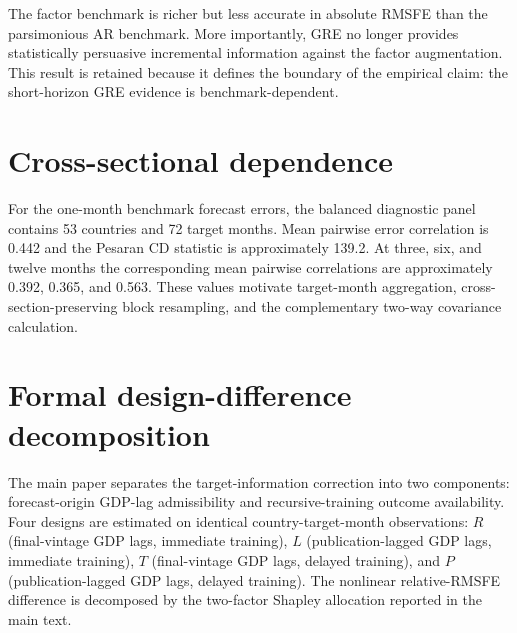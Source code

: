 \documentclass[12pt]{article}
\begin{document}
\begin{table}[htbp]
\centering\scriptsize
\caption{GRE against the wide factor-augmented benchmark at one month}
\end{table}
The factor benchmark is richer but less accurate in absolute RMSFE than the parsimonious AR benchmark. More importantly, GRE no longer provides statistically persuasive incremental information against the factor augmentation. This result is retained because it defines the boundary of the empirical claim: the short-horizon GRE evidence is benchmark-dependent.

\section{Cross-sectional dependence}
For the one-month benchmark forecast errors, the balanced diagnostic panel contains 53 countries and 72 target months. Mean pairwise error correlation is 0.442 and the Pesaran CD statistic is approximately 139.2. At three, six, and twelve months the corresponding mean pairwise correlations are approximately 0.392, 0.365, and 0.563. These values motivate target-month aggregation, cross-section-preserving block resampling, and the complementary two-way covariance calculation.

\section{Formal design-difference decomposition}
The main paper separates the target-information correction into two components: forecast-origin GDP-lag admissibility and recursive-training outcome availability. Four designs are estimated on identical country-target-month observations: $R$ (final-vintage GDP lags, immediate training), $L$ (publication-lagged GDP lags, immediate training), $T$ (final-vintage GDP lags, delayed training), and $P$ (publication-lagged GDP lags, delayed training). The nonlinear relative-RMSFE difference is decomposed by the two-factor Shapley allocation reported in the main text.
\end{document}
